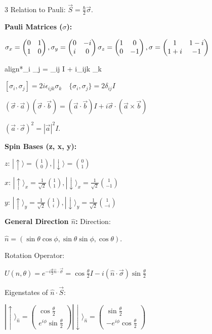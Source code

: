 \documentclass[10pt,a4paper]{article}
\newcommand{\important}[1]{\begin{empheq}[box=\fbox]{align*}#1\end{empheq}}
\begin{document}
\begin{multicols*}{3}
Relation to Pauli: $\vec{S} = \frac{\hbar}{2}\vec{\sigma}$.

\textbf{Pauli Matrices ($\sigma$):}

$\sigma_x = \begin{pmatrix} 0 & 1 \\ 1 & 0 \end{pmatrix}, \sigma_y = \begin{pmatrix} 0 & -i \\ i & 0 \end{pmatrix} \\ \sigma_z = \begin{pmatrix} 1 & 0 \\ 0 & -1 \end{pmatrix}, 
\sigma = \begin{pmatrix} 1 & 1-i \\ 1+i & -1 \end{pmatrix}$
\important{\sigma_i \sigma_j = \delta_{ij} I + i\epsilon_{ijk} \sigma_k}

$[\sigma_i, \sigma_j] = 2i\epsilon_{ijk} \sigma_k \quad \{\sigma_i, \sigma_j\} = 2\delta_{ij} I$

$(\vec{\sigma}\cdot\vec{a})(\vec{\sigma}\cdot\vec{b}) = (\vec{a}\cdot\vec{b})I + i\vec{\sigma}\cdot(\vec{a}\times\vec{b})$

$(\vec{a}\cdot \vec{\sigma})^2=|\vec{a}|^2I$.

\textbf{Spin Bases (z, x, y):}

$z$: $|\uparrow\rangle = \binom{1}{0}, |\downarrow\rangle = \binom{0}{1}$

$x$: $|\uparrow\rangle_x = \frac{1}{\sqrt{2}}\binom{1}{1}, |\downarrow\rangle_x = \frac{1}{\sqrt{2}}\binom{1}{-1}$

$y$: $|\uparrow\rangle_y = \frac{1}{\sqrt{2}}\binom{1}{i}, |\downarrow\rangle_y = \frac{1}{\sqrt{2}}\binom{1}{-i}$

\textbf{General Direction $\hat{n}$:}
Direction: 

$\hat{n} = (\sin\theta\cos\phi, \sin\theta\sin\phi, \cos\theta)$.

Rotation Operator: 

$U(\hat{n}, \theta) = e^{-i\frac{\theta}{2}\hat{n}\cdot\vec{\sigma}} = \cos\frac{\theta}{2} I - i(\hat{n}\cdot\vec{\sigma})\sin\frac{\theta}{2}$

Eigenstates of $\hat{n}\cdot\vec{S}$:

$|\uparrow\rangle_{\hat{n}} = \begin{pmatrix} \cos\frac{\theta}{2} \\ e^{i\phi}\sin\frac{\theta}{2} \end{pmatrix} |\downarrow\rangle_{\hat{n}} = \begin{pmatrix} \sin\frac{\theta}{2} \\ -e^{i\phi}\cos\frac{\theta}{2} \end{pmatrix}$


\end{multicols*}
\end{document}
